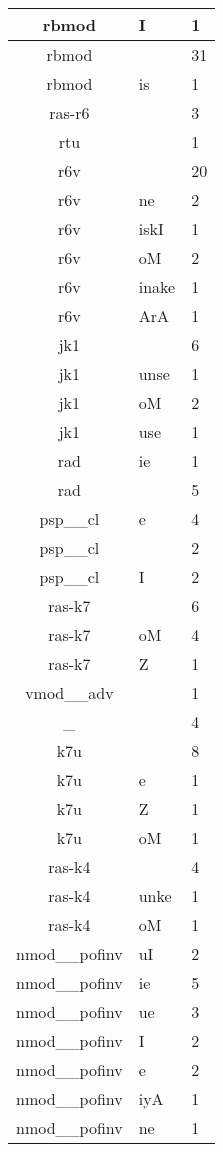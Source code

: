 \documentclass[a4 paper]{article}
\begin{document}
\begin{longtable}{cp{}p{}}
rbmod & I & 1\\ \midrule rbmod &  & 31\\ \midrule rbmod & is & 1\\ \midrule 
ras-r6 &  & 3\\ \midrule 
rtu &  & 1\\ \midrule 
r6v &  & 20\\ \midrule r6v & ne & 2\\ \midrule r6v & iskI & 1\\ \midrule r6v & oM & 2\\ \midrule r6v & inake & 1\\ \midrule r6v & ArA & 1\\ \midrule 
jk1 &  & 6\\ \midrule jk1 & unse & 1\\ \midrule jk1 & oM & 2\\ \midrule jk1 & use & 1\\ \midrule 
rad & ie & 1\\ \midrule rad &  & 5\\ \midrule 
psp\_\_cl & e & 4\\ \midrule psp\_\_cl &  & 2\\ \midrule psp\_\_cl & I & 2\\ \midrule 
ras-k7 &  & 6\\ \midrule ras-k7 & oM & 4\\ \midrule ras-k7 & Z & 1\\ \midrule 
vmod\_\_adv &  & 1\\ \midrule 
\_ & 	 & 4\\ \midrule 
k7u &  & 8\\ \midrule k7u & e & 1\\ \midrule k7u & Z & 1\\ \midrule k7u & oM & 1\\ \midrule 
ras-k4 &  & 4\\ \midrule ras-k4 & unke & 1\\ \midrule ras-k4 & oM & 1\\ \midrule 
nmod\_\_pofinv & uI & 2\\ \midrule nmod\_\_pofinv & ie & 5\\ \midrule nmod\_\_pofinv & ue & 3\\ \midrule nmod\_\_pofinv & I & 2\\ \midrule nmod\_\_pofinv & e & 2\\ \midrule nmod\_\_pofinv & iyA & 1\\ \midrule nmod\_\_pofinv & ne & 1\\ \midrule 

\end{longtable}
\end{document}
